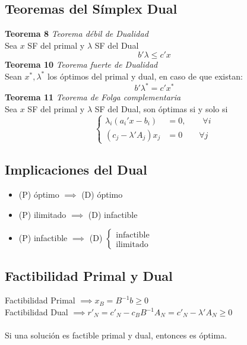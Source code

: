 \documentclass[leqno]{article}
\begin{document}
\subsection{Teoremas del Símplex Dual}
\textbf{Teorema 8} \textit{Teorema débil de Dualidad} \\
Sea $x$ SF del primal y $\lambda$ SF del Dual
$$ b'\lambda \leq c'x$$
\textbf{Teorema 10} \textit{Teorema fuerte de Dualidad}\\
Sean $x^*, \lambda^*$ los óptimos del primal y dual, en caso de que existan:
$$b'\lambda^* = c'x^*$$
\textbf{Teorema 11} \textit{Teorema de Folga complementaria}\\
Sea $x$ SF del primal y $\lambda$ SF del Dual, son óptimas si y solo si
$$
\begin{cases}
\lambda_i(a_i'x - b_i) &= 0, \qquad \forall i \\
(c_j-\lambda'A_j)x_j &= 0 \qquad \forall j
\end{cases}
$$

\subsection{Implicaciones del Dual}
\begin{itemize}
    \item (P) óptimo $\implies$ (D) óptimo
    \item (P) ilimitado $\implies$ (D) infactible
    \item (P) infactible $\implies$ (D) $\begin{cases} \text{infactible} \\ \text{ilimitado} \end{cases}$
\end{itemize}
\subsection{Factibilidad Primal y Dual}
Factibilidad Primal $\implies x_B=B^{-1}b \geq 0$ \\
Factibilidad Dual $\implies r'_N = c'_N - c_B B^{-1} A_N = c'_N - \lambda' A_N \geq 0$ \\
\\
Si una solución es factible primal y dual, entonces es óptima. 
\end{document}
